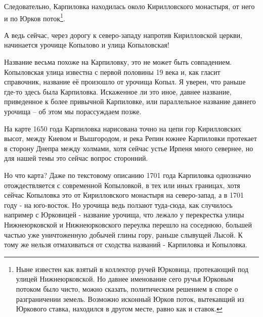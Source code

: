 \documentclass[a5paper,11pt,openany]{article}
\begin{document}
Следовательно, Карпиловка находилась около Кирилловского монастыря, от него и по Юрков поток\footnote{Ныне известен как взятый в коллектор ручей Юрковица, протекающий под улицей Нижнеюрковской. Но давнее именование сего ручья Юрковым потоком было чисто, можно сказать, политическим решением в споре о разграничении земель. Возможно исконный Юрков поток, вытекавщий из Юркового ставка, находился в другом месте, равно как и ставок.}. 

А ведь сейчас, через дорогу к севе\-ро-западу напротив Кирилловской церкви, начинается урочище Копылово и улица Копыловская! 

Название весьма похоже на Карпиловку, это не может быть совпадением. Копыловская улица известна с первой половины 19 века и, как гласит справочник, название её произошло от урочища Копыл. Я уверен, что раньше где-то здесь была Карпиловка. Искаженное ли это иное, давнее название, приведенное к более привычной Карпиловке, или параллельное название давнего урочища – об этом мы порассуждаем позже.

На карте 1650 года Карпиловка нарисована точно на цепи гор Кирилловских высот, между Киевом и Вышгородом, и река Репин южнее Карпиловки протекает в сторону Днепра между холмами, хотя сейчас устье Ирпеня много севернее, но для нашей темы это сейчас вопрос сторонний. 

Но что карта? Даже по текстовому описанию 1701 года Карпиловка однозначно отождествляется с современной Копыловкой, в тех или иных границах, хотя сейчас Копыловка это от Кирилловского монастыря на северо-запад, а в 1701 году - на юго-восток. Но урочища ведь ползают туда-сюда, как случилось например с Юрковицей - название урочища, что лежало у перекрестка улицы Нижнеюрковской и Нижнеюрковского переулка перешло на соседнюю, большей частью уже уничтоженную добычей глины гору, раньше слывущей Лысой. К тому же нельзя отмахиваться от сходства названий - Карпиловка и Копыловка.




\end{document}
